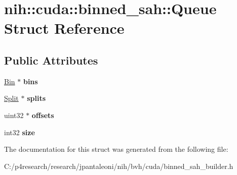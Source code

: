 \hypertarget{structnih_1_1cuda_1_1binned__sah_1_1_queue}{
\section{nih\-:\-:cuda\-:\-:binned\-\_\-sah\-:\-:\-Queue \-Struct \-Reference}
\label{structnih_1_1cuda_1_1binned__sah_1_1_queue}
}
\subsection*{\-Public \-Attributes}
\begin{DoxyCompactItemize}
\item 
\hypertarget{structnih_1_1cuda_1_1binned__sah_1_1_queue_aff238d4fb334d54c834940553943ed09}{
\hyperlink{structnih_1_1cuda_1_1binned__sah_1_1_bin}{\-Bin} $\ast$ {\bfseries bins}}
\label{structnih_1_1cuda_1_1binned__sah_1_1_queue_aff238d4fb334d54c834940553943ed09}

\item 
\hypertarget{structnih_1_1cuda_1_1binned__sah_1_1_queue_ad4afdd0276383ba3579f6336ffc7d4a1}{
\hyperlink{structnih_1_1cuda_1_1binned__sah_1_1_split}{\-Split} $\ast$ {\bfseries splits}}
\label{structnih_1_1cuda_1_1binned__sah_1_1_queue_ad4afdd0276383ba3579f6336ffc7d4a1}

\item 
\hypertarget{structnih_1_1cuda_1_1binned__sah_1_1_queue_a1af898af00d47778ec05e38db8af54df}{
uint32 $\ast$ {\bfseries offsets}}
\label{structnih_1_1cuda_1_1binned__sah_1_1_queue_a1af898af00d47778ec05e38db8af54df}

\item 
\hypertarget{structnih_1_1cuda_1_1binned__sah_1_1_queue_a2eb71c1a3d35300313a8af98235f6110}{
int32 {\bfseries size}}
\label{structnih_1_1cuda_1_1binned__sah_1_1_queue_a2eb71c1a3d35300313a8af98235f6110}

\end{DoxyCompactItemize}


\-The documentation for this struct was generated from the following file\-:\begin{DoxyCompactItemize}
\item 
\-C\-:/p4research/research/jpantaleoni/nih/bvh/cuda/binned\-\_\-sah\-\_\-builder.\-h\end{DoxyCompactItemize}
